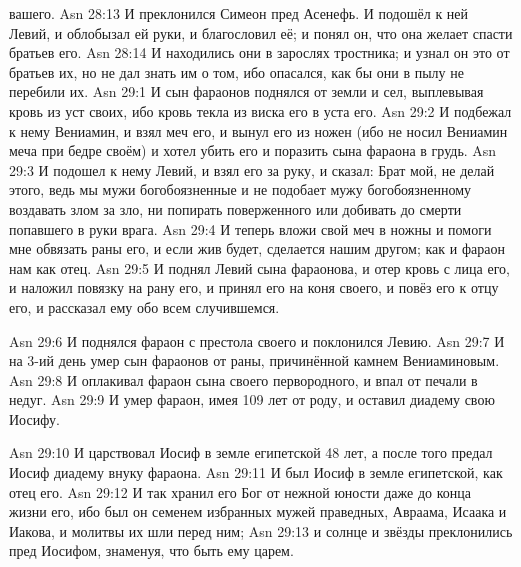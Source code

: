 вашего.
\vs Asn 28:13
И преклонился Симеон пред
Асенефь. И подошёл к ней Левий, и облобызал ей руки, и благословил её; и понял
он, что она желает спасти братьев его.
\vs Asn 28:14
И находились они в зарослях
тростника; и узнал он это от братьев их, но не дал знать им о том, ибо опасался,
как бы они в пылу не перебили их.
\vs Asn 29:1
И сын фараонов поднялся от
земли и сел, выплевывая кровь из уст своих, ибо кровь текла из виска его в уста
его.
\vs Asn 29:2
И подбежал к нему Вениамин,
и взял меч его, и вынул его из ножен (ибо не носил Вениамин меча при бедре
своём) и хотел убить его и поразить сына фараона в грудь.
\vs Asn 29:3
И подошел к нему Левий, и
взял его за руку, и сказал: Брат мой, не делай этого, ведь мы мужи
богобоязненные и не подобает мужу богобоязненному воздавать злом за зло, ни
попирать поверженного или добивать до смерти попавшего в руки врага.
\vs Asn 29:4
И теперь вложи свой меч в
ножны и помоги мне обвязать раны его, и если жив будет, сделается нашим другом;
как и фараон нам как отец.
\vs Asn 29:5
И поднял Левий сына
фараонова, и отер кровь с лица его, и наложил повязку на рану его, и принял его
на коня своего, и повёз его к отцу его, и рассказал ему обо всем случившемся.

\vs Asn 29:6
И поднялся фараон с престола своего и поклонился Левию.
\vs Asn 29:7
И на 3-ий день умер сын
фараонов от раны, причинённой камнем Вениаминовым.
\vs Asn 29:8
И оплакивал фараон сына
своего первородного, и впал от печали в недуг.
\vs Asn 29:9
И умер фараон, имея 109 лет от роду, и оставил диадему свою Иосифу.

\vs Asn 29:10
И царствовал Иосиф в земле
египетской 48 лет, а после того предал Иосиф диадему внуку фараона.
\vs Asn 29:11
И был Иосиф в земле
египетской, как отец его.
\vs Asn 29:12
И так хранил его Бог от
нежной юности даже до конца жизни его, ибо был он семенем избранных мужей
праведных, Авраама, Исаака и Иакова, и молитвы их шли перед ним;
\vs Asn 29:13
и солнце и звёзды
преклонились пред Иосифом, знаменуя, что быть ему царем.
